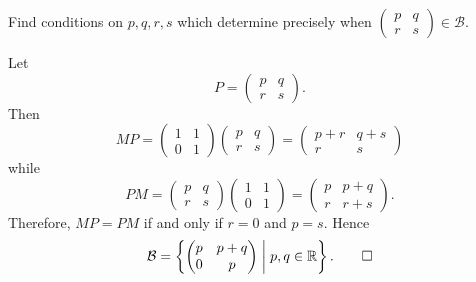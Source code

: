  Find conditions on $p, q, r, s$ which determine precisely
when $\begin{pmatrix} p & q \\ r & s \end{pmatrix} \in \mathcal{B}$.
\begin{solution}
  Let
  \begin{equation*}
    P = \begin{pmatrix} p & q \\ r & s \end{pmatrix}.
  \end{equation*}
  Then
  \begin{equation*}
    MP = \begin{pmatrix} 1 & 1 \\ 0 & 1 \end{pmatrix}
    \begin{pmatrix} p & q \\ r & s \end{pmatrix}
    = \begin{pmatrix} p + r & q + s \\ r & s \end{pmatrix}
  \end{equation*}
  while
  \begin{equation*}
    PM = \begin{pmatrix} p & q \\ r & s \end{pmatrix}
    \begin{pmatrix} 1 & 1 \\ 0 & 1 \end{pmatrix}
    = \begin{pmatrix} p & p + q \\ r & r + s \end{pmatrix}.
  \end{equation*}
  Therefore, $MP = PM$ if and only if $r = 0$ and $p = s$. Hence
  \begin{equation*}
    \mathcal{B} = \left\{ \begin{pmatrix} p & p + q \\ 0 & p \end{pmatrix}
      \;\middle|\; p, q\in\mathbb{R} \right\}. \qedhere
  \end{equation*}
\end{solution}

